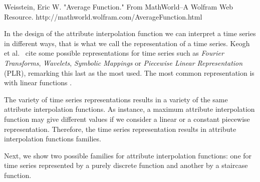 {\begin{itemize}
Weisstein, Eric W. "Average Function." From MathWorld--A Wolfram Web Resource. http://mathworld.wolfram.com/AverageFunction.html


\end{itemize}


In the design of the attribute interpolation function we can interpret
a time series in different ways, that is what we call the
representation of a time series. Keogh et al.\ \cite{last:keogh} cite some
possible representations for time series such as \emph{Fourier
  Transforms}, \emph{Wavelets}, \emph{Symbolic Mappings} or
\emph{Piecewise Linear Representation} (PLR), remarking this last as
the most used. The most common representation is with linear functions
\cite{keogh01}.  

The variety of time series representations results in a variety of the
same attribute interpolation functions. As instance, a maximum
attribute interpolation function may give different values if we
consider a linear or a constant piecewise representation. Therefore,
the time series representation results in attribute interpolation
functions families.


Next, we show two possible families for attribute interpolation
functions: one for time series represented by a purely discrete
function and another by a staircase function.


}








